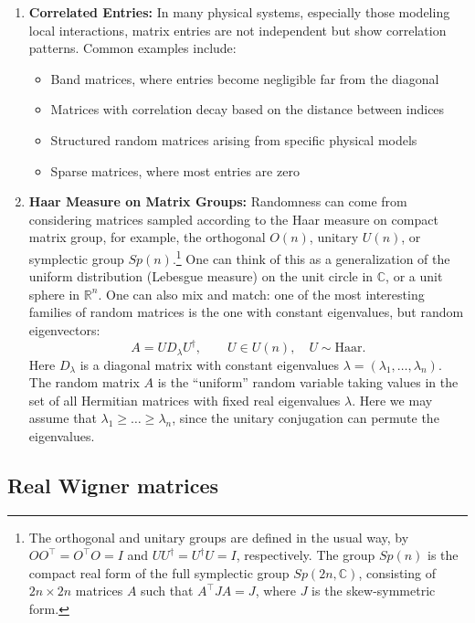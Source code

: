 \documentclass[letterpaper,11pt,oneside,reqno]{article}
\numberwithin{equation}{section}
\theoremstyle{definition}
\begin{document}
\begin{enumerate}
\item \textbf{Correlated Entries:}
In many physical systems, especially those modeling local interactions, matrix entries are not independent but show correlation patterns. Common examples include:
\begin{itemize}
\item Band matrices, where entries become negligible far from the diagonal
\item Matrices with correlation decay based on the distance between indices
\item Structured random matrices arising from specific physical models
\item Sparse matrices, where most entries are zero
\end{itemize}
\item \textbf{Haar Measure on Matrix Groups:}
Randomness can come from considering matrices sampled according to the Haar measure on compact matrix group,
for example, the orthogonal $O(n)$, unitary $U(n)$, or symplectic group $Sp(n)$.\footnote{The
	orthogonal and unitary groups are defined
	in the usual way, by $OO^\top=O^\top O=I$ and $UU^\dagger
	=U^\dagger U=I$, respectively.
	The
	group $Sp(n)$ is the compact real form of the full symplectic group $Sp(2n, \mathbb{C})$,
	consisting of $2n\times 2n$ matrices $A$ such that $A^\top JA=J$, where
	$J$ is the skew-symmetric form.}
One can think of this as a generalization of
the uniform distribution (Lebesgue measure) on the unit circle in $\mathbb{C}$,
or a unit sphere in $\mathbb{R}^n$.
One can also mix and match: one
of the most interesting families of random matrices is the one
with constant eigenvalues, but random eigenvectors:
\begin{equation*}
	A=UD_\lambda U^\dagger,\qquad U\in U(n), \quad U\sim \mathrm{Haar}.
\end{equation*}
Here $D_\lambda$ is a diagonal matrix with constant eigenvalues $\lambda=(\lambda_1,\ldots,\lambda_n)$.
The random matrix $A$ is the ``uniform'' random variable
taking values in the set of all Hermitian matrices with fixed real eigenvalues $\lambda$.
Here we may assume that $\lambda_1\ge \ldots\ge \lambda_n $,
since the unitary conjugation can permute the eigenvalues.
\end{enumerate}

\subsection{Real Wigner matrices}
\end{document}
